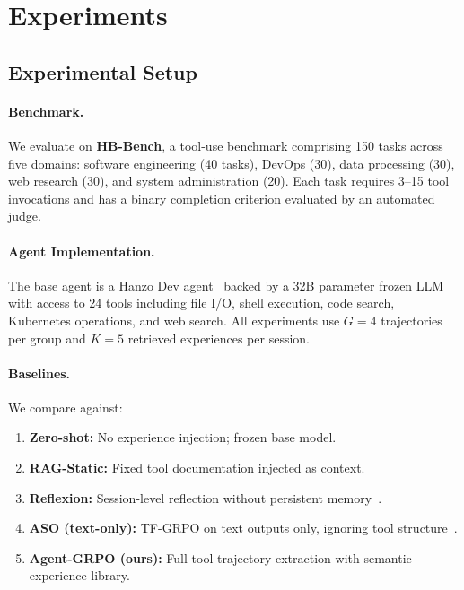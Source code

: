 \documentclass[11pt]{article}
\begin{document}
\section{Experiments}
\label{sec:experiments}

\subsection{Experimental Setup}

\paragraph{Benchmark.}
We evaluate on \textbf{HB-Bench}, a tool-use benchmark comprising 150 tasks
across five domains: software engineering (40 tasks), DevOps (30), data
processing (30), web research (30), and system administration (20). Each task
requires 3--15 tool invocations and has a binary completion criterion evaluated
by an automated judge.

\paragraph{Agent Implementation.}
The base agent is a Hanzo Dev agent~\cite{hanzo2026aso} backed by a 32B
parameter frozen LLM with access to 24 tools including file I/O, shell
execution, code search, Kubernetes operations, and web search. All experiments
use $G = 4$ trajectories per group and $K = 5$ retrieved experiences per
session.

\paragraph{Baselines.}
We compare against:
\begin{enumerate}[leftmargin=1.5em]
    \item \textbf{Zero-shot:} No experience injection; frozen base model.
    \item \textbf{RAG-Static:} Fixed tool documentation injected as context.
    \item \textbf{Reflexion:} Session-level reflection without persistent memory~\cite{shinn2023reflexion}.
    \item \textbf{ASO (text-only):} TF-GRPO on text outputs only, ignoring
          tool structure~\cite{hanzo2026aso}.
    \item \textbf{Agent-GRPO (ours):} Full tool trajectory extraction with
          semantic experience library.
\end{enumerate}
\end{document}
